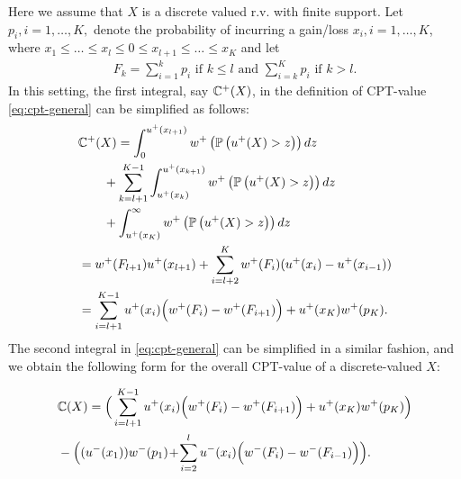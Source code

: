 Here we assume that $X$ is a discrete valued r.v. with finite support. 
Let $p_i, i=1,\ldots,K,$ denote the probability of incurring a gain/loss $x_i, i=1,\ldots,K$, where 
$x_1\le \ldots \le x_l \le 0 \le x_{l+1} \le \ldots \le x_K$ and let
\begin{align}
\label{eq:Fk}
 F_k = 
   \sum_{i=1}^k p_i  \text{ if   } k \leq l \text{ and }
   \sum_{i=k}^K p_i  \text{ if  }  k > l.
\end{align}
In this setting, the first integral, say $\mathbb{C}^+(X)$, in the definition of CPT-value \eqref{eq:cpt-general} can be simplified as follows:
\begin{align}
&\mathbb{C}^+(X)  =  \int_0^{u^+(x_{l+1})} w^+\left(\mathbb{P}\left( u^+(X)>z \right)\right) dz   \nonumber \\
&\qquad+\sum_{k=l+1}^{K-1}\int_{u^+(x_{k})}^{u^+(x_{k+1})} w^+\left(\mathbb{P}\left( u^+(X)>z \right)\right) dz  \nonumber\\
&\qquad+\int_{u^+(x_{K})}^\infty w^+\left(\mathbb{P}\left( u^+(X)>z \right)\right)  dz \nonumber\\
&= w^+(F_{l+1}) u^+(x_{l+1})+\sum_{i=l+2}^K w^+(F_i)(u^+(x_i) - u^+(x_{i-1})) \nonumber\\
&= \sum_{i=l+1}^{K-1} u^+(x_i) \Big(w^+(F_i) - w^+(F_{i+1})\Big)
 + u^+(x_K) w^+(p_K).\nonumber
\end{align}
The second integral in \eqref{eq:cpt-general} can be simplified in a similar fashion, and we obtain the following form for the overall CPT-value of a discrete-valued $X$:
\begin{small}
\begin{align*}
&\mathbb{C}(X)= \Big(\sum_{i=l+1}^{K-1} u^+(x_i) \Big(w^+(F_i) - w^+(F_{i+1})\Big)
 + u^+(x_K) w^+(p_K)\Big)\\
& -\Big((u^-(x_1)) w^-(p_1) 
\!+\!\sum_{i=2}^l u^-(x_i) \Big(w^-(F_i) - w^-(F_{i-1})\Big)\Big).
\end{align*} 
\end{small}

